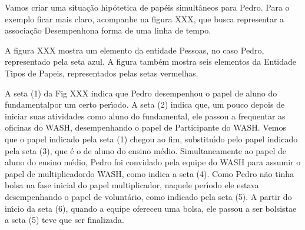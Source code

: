 \documentclass[
12pt,		%
openright,	%
twoside,  %
a4paper,			%
chapter=TITLE,		%
english,			%
french,				%
spanish,			%
brazil				%
]{USPSC-classe/USPSC}
\begin{document}
Vamos criar uma situa\c{c}\~ao hip\'otetica de pap\'eis simult\^aneos para Pedro. Para o exemplo ficar mais claro, acompanhe na figura XXX, que busca representar a associa\c{c}\~ao \textquotedbl Desempenho\textquotedbl  na forma de uma linha de tempo.










A figura XXX mostra um elemento da entidade \textquotedbl Pessoas\textquotedbl , no caso \textquotedbl Pedro\textquotedbl , representado pela seta azul. A figura tamb\'em mostra seis elementos da Entidade \textquotedbl Tipos de Papeis\textquotedbl , representados pelas setas vermelhas.










A seta (1) da Fig XXX indica que Pedro desempenhou o papel de \textquotedbl aluno do fundamental\textquotedbl  por um certo per\'{\i}odo. A seta (2) indica que, um pouco depois de iniciar suas atividades como \textquotedbl aluno do fundamental\textquotedbl , ele passou a frequentar as oficinas do WASH, desempenhando o papel de \textquotedbl Participante do WASH\textquotedbl . Vemos que o papel indicado pela seta (1) chegou ao fim, substitu\'{\i}do pelo papel indicado pela seta (3), que \'e o de \textquotedbl aluno do ensino m\'edio\textquotedbl . Simultaneamente ao papel de \textquotedbl aluno do ensino m\'edio\textquotedbl , Pedro foi convidado pela equipe do WASH para assumir o papel de \textquotedbl multiplicador\textquotedbl  do WASH, como indica a seta (4). Como Pedro n\~ao tinha bolsa na fase inicial do papel \textquotedbl multiplicador\textquotedbl , naquele per\'{\i}odo ele estava desempenhando o papel de \textquotedbl volunt\'ario\textquotedbl , como indicado pela seta (5). A partir do in\'{\i}cio da seta (6), quando a equipe ofereceu uma bolsa, ele passou a ser \textquotedbl bolsista\textquotedbl  e a seta (5) teve que ser finalizada.
\end{document}
